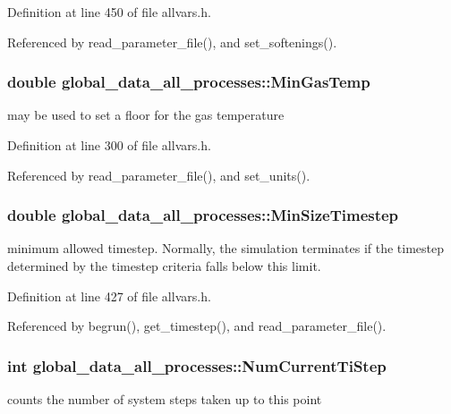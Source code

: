Definition at line 450 of file allvars.h.



Referenced by read\_\-parameter\_\-file(), and set\_\-softenings().

\hypertarget{structglobal__data__all__processes_a728a84084280f547b1b68dbb143570ad}{
\subsubsection[{MinGasTemp}]{\setlength{\rightskip}{0pt plus 5cm}double {\bf global\_\-data\_\-all\_\-processes::MinGasTemp}}}
\label{structglobal__data__all__processes_a728a84084280f547b1b68dbb143570ad}
may be used to set a floor for the gas temperature 

Definition at line 300 of file allvars.h.



Referenced by read\_\-parameter\_\-file(), and set\_\-units().

\hypertarget{structglobal__data__all__processes_ab5f56d94a4417c5a703b6d2d4cb81a05}{
\subsubsection[{MinSizeTimestep}]{\setlength{\rightskip}{0pt plus 5cm}double {\bf global\_\-data\_\-all\_\-processes::MinSizeTimestep}}}
\label{structglobal__data__all__processes_ab5f56d94a4417c5a703b6d2d4cb81a05}
minimum allowed timestep. Normally, the simulation terminates if the timestep determined by the timestep criteria falls below this limit. 

Definition at line 427 of file allvars.h.



Referenced by begrun(), get\_\-timestep(), and read\_\-parameter\_\-file().

\hypertarget{structglobal__data__all__processes_a35de8a7666698b80478bfedf4362e844}{
\subsubsection[{NumCurrentTiStep}]{\setlength{\rightskip}{0pt plus 5cm}int {\bf global\_\-data\_\-all\_\-processes::NumCurrentTiStep}}}
\label{structglobal__data__all__processes_a35de8a7666698b80478bfedf4362e844}
counts the number of system steps taken up to this point 


